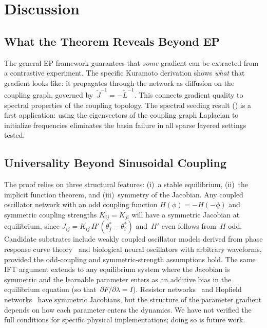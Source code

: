 \documentclass[11pt,a4paper]{article}
\begin{document}

\section{Discussion}
\label{sec:discussion}

\subsection{What the Theorem Reveals Beyond EP}

The general EP framework guarantees that \emph{some} gradient can be
extracted from a contrastive experiment. The specific Kuramoto derivation
shows \emph{what} that gradient looks like: it propagates through the
network as diffusion on the coupling graph, governed
by~$\tilde{J}^{-1} = -\tilde{L}^{-1}$. This connects gradient
quality to spectral properties of the coupling topology. The spectral
seeding result () is a first application:
using the eigenvectors of the coupling graph Laplacian to initialize
frequencies eliminates the basin failure in all sparse layered settings
tested.

\subsection{Universality Beyond Sinusoidal Coupling}
\label{sec:universality}

The proof relies on three structural features: (i)~a stable equilibrium,
(ii)~the implicit function theorem, and (iii)~symmetry of the Jacobian.
Any coupled oscillator network with an odd coupling function
$H(\phi) = -H(-\phi)$ and symmetric coupling strengths $K_{ij} = K_{ji}$
will have a symmetric Jacobian at equilibrium, since
$J_{ij} = K_{ij}\,H'(\theta_j^* - \theta_i^*)$ and~$H'$ even follows
from~$H$ odd. Candidate substrates include weakly coupled oscillator models
derived from phase response curve
theory~\citep{hoppensteadt1999oscillatory} and biological neural
oscillators with arbitrary waveforms, provided the odd-coupling and
symmetric-strength assumptions hold. The same IFT argument extends to
any equilibrium system where the Jacobian is symmetric and the learnable
parameter enters as an additive bias in the equilibrium equation (so
that~$\partial F / \partial \lambda = I$). Resistor
networks~\citep{dillavou2024machine} and Hopfield
networks~\citep{hopfield1982neural} have symmetric Jacobians, but the
structure of the parameter gradient depends on how each parameter enters
the dynamics. We have not verified the full conditions for specific
physical implementations; doing so is future work.
\end{document}

